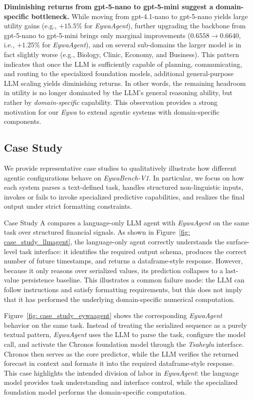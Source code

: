 \documentclass{llmxive}
\begin{document}
{\textbf{Diminishing returns from gpt-5-nano to gpt-5-mini suggest a domain-specific bottleneck.} While moving from gpt-4.1-nano to gpt-5-nano yields large utility gains (e.g., $+15.5\%$ for \textit{EywaAgent}), further upgrading the backbone from gpt-5-nano to gpt-5-mini brings only marginal improvements ($0.6558 \rightarrow 0.6640$, i.e., $+1.25\%$ for \textit{EywaAgent}), and on several sub-domains the larger model is in fact slightly worse (e.g., Biology, Clinic, Economy, and Business). This pattern indicates that once the LLM is sufficiently capable of planning, communicating, and routing to the specialized foundation models, additional general-purpose LLM scaling yields diminishing returns. In other words, the remaining headroom in utility is no longer dominated by the LLM's general reasoning ability, but rather by \emph{domain-specific} capability. This observation provides a strong motivation for our \textit{Eywa} to extend agentic systems with domain-specific components.


\subsection{Case Study}
\label{ap:case_study}


We provide representative case studies to qualitatively illustrate how different agentic configurations behave on \textit{EywaBench-V1}. In particular, we focus on how each system parses a text-defined task, handles structured non-linguistic inputs, invokes or fails to invoke specialized predictive capabilities, and realizes the final output under strict formatting constraints.

Case Study A compares a language-only LLM agent with \textit{EywaAgent} on the same task over structured financial signals. As shown in Figure~\ref{fig: case_study_llmagent}, the language-only agent correctly understands the surface-level task interface: it identifies the required output schema, produces the correct number of future timestamps, and returns a dataframe-style response. However, because it only reasons over serialized values, its prediction collapses to a last-value persistence baseline. This illustrates a common failure mode: the LLM can follow instructions and satisfy formatting requirements, but this does not imply that it has performed the underlying domain-specific numerical computation.

Figure~\ref{fig: case_study_eywaagent} shows the corresponding \textit{EywaAgent} behavior on the same task. Instead of treating the serialized sequence as a purely textual pattern, \textit{EywaAgent} uses the LLM to parse the task, configure the model call, and activate the Chronos foundation model through the \textit{Tsaheylu} interface. Chronos then serves as the core predictor, while the LLM verifies the returned forecast in context and formats it into the required dataframe-style response. This case highlights the intended division of labor in \textit{EywaAgent}: the language model provides task understanding and interface control, while the specialized foundation model performs the domain-specific computation.

}
\end{document}
